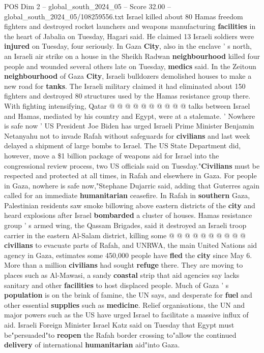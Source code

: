 \begin{textsample}{POS Dim 2 – global\_south\_2024\_05 – Score 32.00 – global\_south\_2024\_05/108259556.txt}
Israel killed about 80 Hamas freedom fighters and destroyed rocket launchers and weapons manufacturing \textbf{facilities} in the heart of Jabalia on Tuesday, Hagari said.
He claimed 13 Israeli soldiers were \textbf{injured} on Tuesday, four seriously.
In Gaza \textbf{City}, also in the enclave ' s north, an Israeli air strike on a house in the Sheikh Radwan \textbf{neighbourhood} killed four people and wounded several others late on Tuesday, \textbf{medics} said.
In the Zeitoun \textbf{neighbourhood} of Gaza \textbf{City}, Israeli bulldozers demolished houses to make a new road for \textbf{tanks}.
The Israeli military claimed it had eliminated about 150 fighters and destroyed 80 structures used by the Hamas resistance group there.
With fighting intensifying, Qatar @ @ @ @ @ @ @ @ @ @ talks between Israel and Hamas, mediated by his country and Egypt, were at a stalemate. ' Nowhere is safe now ' US President Joe Biden has urged Israeli Prime Minister Benjamin Netanyahu not to invade Rafah without safeguards for \textbf{civilians} and last week delayed a shipment of large bombs to Israel.
The US State Department did, however, move a \$1 billion package of weapons aid for Israel into the congressional review process, two US officials said on Tuesday."\textbf{Civilians} must be respected and protected at all times, in Rafah and elsewhere in Gaza.
For people in Gaza, nowhere is safe now,"Stephane Dujarric said, adding that Guterres again called for an immediate \textbf{humanitarian} ceasefire.
In Rafah in \textbf{southern} Gaza, Palestinian residents saw smoke billowing above eastern districts of the \textbf{city} and heard explosions after Israel \textbf{bombarded} a cluster of houses.
Hamas resistance group ' s armed wing, the Qassam Brigades, said it destroyed an Israeli troop carrier in the eastern Al-Salam district, killing some @ @ @ @ @ @ @ @ @ @ \textbf{civilians} to evacuate parts of Rafah, and UNRWA, the main United Nations aid agency in Gaza, estimates some 450,000 people have \textbf{fled} the \textbf{city} since May 6.
More than a million \textbf{civilians} had sought \textbf{refuge} there.
They are moving to places such as Al-Mawasi, a sandy \textbf{coastal} strip that aid agencies say lacks sanitary and other \textbf{facilities} to host displaced people.
Much of Gaza ' s \textbf{population} is on the brink of famine, the UN says, and desperate for \textbf{fuel} and other essential \textbf{supplies} such as \textbf{medicine}.
Relief organisations, the UN and major powers such as the US have urged Israel to facilitate a massive influx of aid.
Israeli Foreign Minister Israel Katz said on Tuesday that Egypt must be"persuaded"to \textbf{reopen} the Rafah border crossing to"allow the continued \textbf{delivery} of international \textbf{humanitarian} aid"into Gaza.

\end{textsample}
